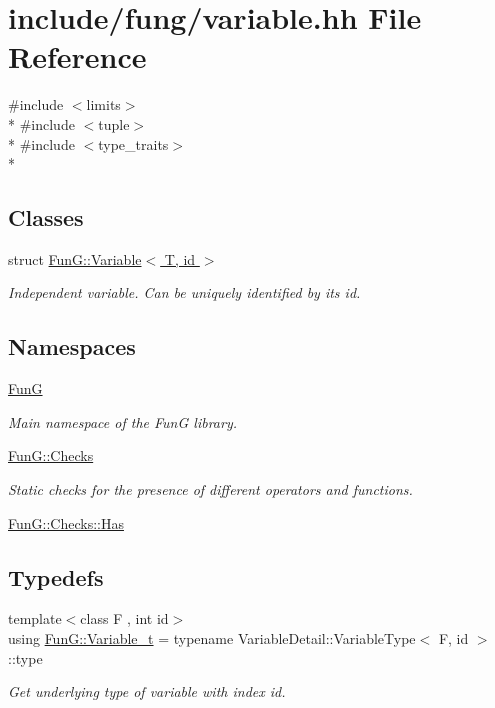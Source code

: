 \hypertarget{variable_8hh}{\section{include/fung/variable.hh File Reference}
\label{variable_8hh}
}
{\ttfamily \#include $<$limits$>$}\\*
{\ttfamily \#include $<$tuple$>$}\\*
{\ttfamily \#include $<$type\-\_\-traits$>$}\\*
\subsection*{Classes}
\begin{DoxyCompactItemize}
\item 
struct \hyperlink{structFunG_1_1Variable}{Fun\-G\-::\-Variable$<$ T, id $>$}
\begin{DoxyCompactList}\small\item\em Independent variable. Can be uniquely identified by its id. \end{DoxyCompactList}\end{DoxyCompactItemize}
\subsection*{Namespaces}
\begin{DoxyCompactItemize}
\item 
\hyperlink{namespaceFunG}{Fun\-G}
\begin{DoxyCompactList}\small\item\em Main namespace of the Fun\-G library. \end{DoxyCompactList}\item 
\hyperlink{namespaceFunG_1_1Checks}{Fun\-G\-::\-Checks}
\begin{DoxyCompactList}\small\item\em Static checks for the presence of different operators and functions. \end{DoxyCompactList}\item 
\hyperlink{namespaceFunG_1_1Checks_1_1Has}{Fun\-G\-::\-Checks\-::\-Has}
\end{DoxyCompactItemize}
\subsection*{Typedefs}
\begin{DoxyCompactItemize}
\item 
{\footnotesize template$<$class F , int id$>$ }\\using \hyperlink{namespaceFunG_a3d589ef7d011a46a72847eabcbbb4532}{Fun\-G\-::\-Variable\-\_\-t} = typename Variable\-Detail\-::\-Variable\-Type$<$ F, id $>$\-::type
\begin{DoxyCompactList}\small\item\em Get underlying type of variable with index id. \end{DoxyCompactList}\end{DoxyCompactItemize}
